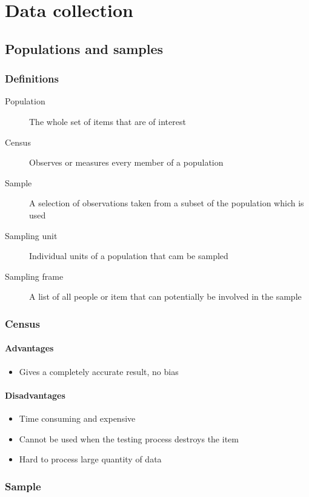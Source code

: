 	\chapter{Data collection}
\section{Populations and samples}
\subsection{Definitions}
\begin{description}
	\item[Population] The whole set of items that are of interest
	\item[Census] Observes or measures every member of a population
	\item[Sample] A selection of observations taken from a subset of the population which is used
	\item[Sampling unit] Individual units of a population that cam be sampled
	\item[Sampling frame] A list of all people or item that can potentially be involved in the sample
\end{description}

\subsection{Census}
\subsubsection{Advantages}
\begin{itemize}
	\item Gives a completely accurate result, no bias
\end{itemize}
\subsubsection{Disadvantages}
\begin{itemize}
	\item Time consuming and expensive
	\item Cannot be used when the testing process destroys the item
	\item Hard to process large quantity of data
\end{itemize}
\subsection{Sample}
